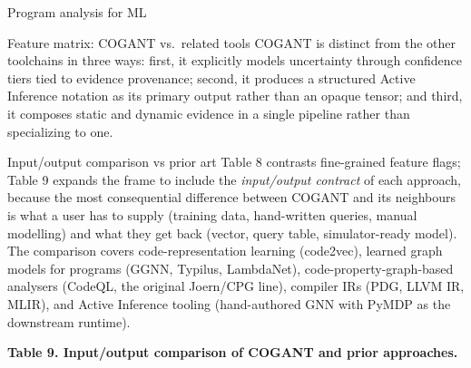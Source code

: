 \documentclass[
  ignorenonframetext,
]{beamer}
\begin{document}
\begin{frame}[fragile]{Program analysis for ML}
\begin{block}{Feature matrix: COGANT vs.~related tools}
COGANT is distinct from the other toolchains in three ways: first, it
explicitly models uncertainty through confidence tiers tied to evidence
provenance; second, it produces a structured Active Inference notation
as its primary output rather than an opaque tensor; and third, it
composes static and dynamic evidence in a single pipeline rather than
specializing to one.
\end{block}

\begin{block}{Input/output comparison vs prior art}
\protect{}\label{inputoutput-comparison-vs-prior-art}
Table 8 contrasts fine-grained feature flags; Table 9 expands the frame
to include the \emph{input/output contract} of each approach, because
the most consequential difference between COGANT and its neighbours is
what a user has to supply (training data, hand-written queries, manual
modelling) and what they get back (vector, query table, simulator-ready
model). The comparison covers code-representation learning (code2vec),
learned graph models for programs (GGNN, Typilus, LambdaNet),
code-property-graph-based analysers (CodeQL, the original Joern/CPG
line), compiler IRs (PDG, LLVM IR, MLIR), and Active Inference tooling
(hand-authored GNN with PyMDP as the downstream runtime).

\textbf{Table 9. Input/output comparison of COGANT and prior
approaches.}


\end{block}
\end{frame}
\end{document}
